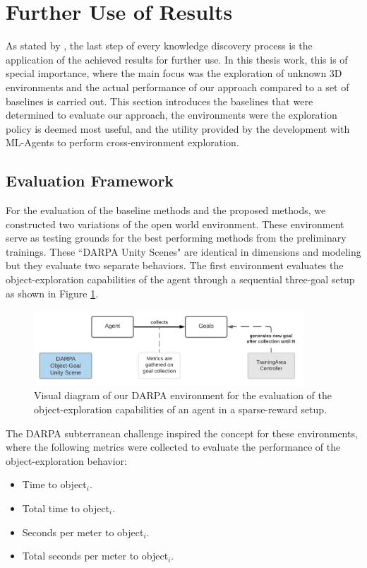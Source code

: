 \section{Further Use of Results}\label{chap:3:further-use}
As stated by \textcite{luckert2016using}, the last step of every knowledge discovery process is the application of the achieved results for further use. In this thesis work, this is of special importance, where the main focus was the exploration of unknown 3D environments and the actual performance of our approach compared to a set of baselines is carried out. This section introduces the baselines that were determined to evaluate our approach, the environments were the exploration policy is deemed most useful, and the utility provided by the development with ML-Agents to perform cross-environment exploration.

\subsection{Evaluation Framework}\label{chap:3:further-use:evaluation-framework}
For the evaluation of the baseline methods and the proposed methods, we constructed two variations of the open world environment. These environment serve as testing grounds for the best performing methods from the preliminary trainings. These “DARPA Unity Scenes" are identical in dimensions and modeling but they evaluate two separate behaviors. The first environment evaluates the object-exploration capabilities of the agent through a sequential three-goal setup as shown in Figure \ref{fig:darpa-object-setup}. 
\begin{figure}[!ht]
        \centering
        \includegraphics[width=0.9\textwidth]{images/darpa-object-setup_3.png} 
        \caption{Visual diagram of our DARPA environment for the evaluation of the object-exploration capabilities of an agent in a sparse-reward setup.}
        \label{fig:darpa-object-setup}
\end{figure}

The DARPA subterranean challenge \cite{darpa_subterranean_challenge} inspired the concept for these environments, where the following metrics were collected to evaluate the performance of the object-exploration behavior:
\begin{multicols}{2}
    \begin{itemize}
        \item Time to object$_i$.
        \item Total time to object$_i$.
        \item Seconds per meter to object$_i$.
        \item Total seconds per meter to object$_i$.
    \end{itemize}
\end{multicols}

